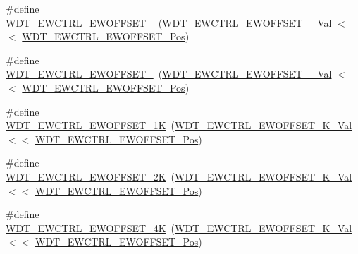 \begin{DoxyCompactItemize}
\item 
\#define \mbox{\hyperlink{group___s_a_m_d21___w_d_t_gaa9ab3bc4d0c9f5111fe8d50318c0b5c9}{W\+D\+T\+\_\+\+E\+W\+C\+T\+R\+L\+\_\+\+E\+W\+O\+F\+F\+S\+E\+T\+\_}}~(\mbox{\hyperlink{group___s_a_m_d21___w_d_t_ga695d61fe243838dec7d761c2d4e0450b}{W\+D\+T\+\_\+\+E\+W\+C\+T\+R\+L\+\_\+\+E\+W\+O\+F\+F\+S\+E\+T\+\_\+\_\+\+Val}}   $<$$<$ \mbox{\hyperlink{group___s_a_m_d21___w_d_t_gabb7809711cdf296121c2108b55d3ad33}{W\+D\+T\+\_\+\+E\+W\+C\+T\+R\+L\+\_\+\+E\+W\+O\+F\+F\+S\+E\+T\+\_\+\+Pos}})
\item 
\#define \mbox{\hyperlink{group___s_a_m_d21___w_d_t_ga72b2b646fc5211bf965d1ce3958bf103}{W\+D\+T\+\_\+\+E\+W\+C\+T\+R\+L\+\_\+\+E\+W\+O\+F\+F\+S\+E\+T\+\_}}~(\mbox{\hyperlink{group___s_a_m_d21___w_d_t_ga5bd63d64662a1a38e87476045ec989c0}{W\+D\+T\+\_\+\+E\+W\+C\+T\+R\+L\+\_\+\+E\+W\+O\+F\+F\+S\+E\+T\+\_\+\_\+\+Val}}   $<$$<$ \mbox{\hyperlink{group___s_a_m_d21___w_d_t_gabb7809711cdf296121c2108b55d3ad33}{W\+D\+T\+\_\+\+E\+W\+C\+T\+R\+L\+\_\+\+E\+W\+O\+F\+F\+S\+E\+T\+\_\+\+Pos}})
\item 
\#define \mbox{\hyperlink{group___s_a_m_d21___w_d_t_gab56b36b15366824f7d700fc16c5eafa9}{W\+D\+T\+\_\+\+E\+W\+C\+T\+R\+L\+\_\+\+E\+W\+O\+F\+F\+S\+E\+T\+\_\+1K}}~(\mbox{\hyperlink{group___s_a_m_d21___w_d_t_gae03a5647efdd09f0a25b51e47cc876ce}{W\+D\+T\+\_\+\+E\+W\+C\+T\+R\+L\+\_\+\+E\+W\+O\+F\+F\+S\+E\+T\+\_\+K\+\_\+\+Val}}    $<$$<$ \mbox{\hyperlink{group___s_a_m_d21___w_d_t_gabb7809711cdf296121c2108b55d3ad33}{W\+D\+T\+\_\+\+E\+W\+C\+T\+R\+L\+\_\+\+E\+W\+O\+F\+F\+S\+E\+T\+\_\+\+Pos}})
\item 
\#define \mbox{\hyperlink{group___s_a_m_d21___w_d_t_ga6003ecd07cd72174e45ee4ee72a3a352}{W\+D\+T\+\_\+\+E\+W\+C\+T\+R\+L\+\_\+\+E\+W\+O\+F\+F\+S\+E\+T\+\_\+2K}}~(\mbox{\hyperlink{group___s_a_m_d21___w_d_t_gae97601bb67a5cc471b8fe5ab4eecc3ca}{W\+D\+T\+\_\+\+E\+W\+C\+T\+R\+L\+\_\+\+E\+W\+O\+F\+F\+S\+E\+T\+\_\+K\+\_\+\+Val}}    $<$$<$ \mbox{\hyperlink{group___s_a_m_d21___w_d_t_gabb7809711cdf296121c2108b55d3ad33}{W\+D\+T\+\_\+\+E\+W\+C\+T\+R\+L\+\_\+\+E\+W\+O\+F\+F\+S\+E\+T\+\_\+\+Pos}})
\item 
\#define \mbox{\hyperlink{group___s_a_m_d21___w_d_t_gabc04f56b5e35872db574433a43787761}{W\+D\+T\+\_\+\+E\+W\+C\+T\+R\+L\+\_\+\+E\+W\+O\+F\+F\+S\+E\+T\+\_\+4K}}~(\mbox{\hyperlink{group___s_a_m_d21___w_d_t_ga42ef5dba73e2a26456fa3f603c71d5a9}{W\+D\+T\+\_\+\+E\+W\+C\+T\+R\+L\+\_\+\+E\+W\+O\+F\+F\+S\+E\+T\+\_\+K\+\_\+\+Val}}    $<$$<$ \mbox{\hyperlink{group___s_a_m_d21___w_d_t_gabb7809711cdf296121c2108b55d3ad33}{W\+D\+T\+\_\+\+E\+W\+C\+T\+R\+L\+\_\+\+E\+W\+O\+F\+F\+S\+E\+T\+\_\+\+Pos}})
$$
\end{DoxyCompactItemize}
